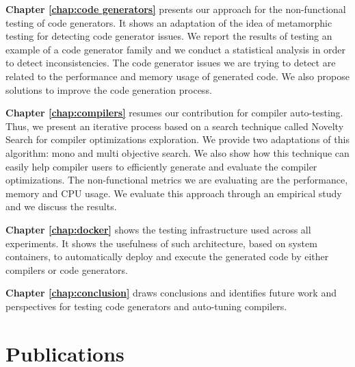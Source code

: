 \textbf{Chapter \ref{chap:code generators}} presents our approach for the non-functional testing of code generators. It shows an adaptation of the idea of metamorphic testing for detecting code generator issues. We report the results of testing an example of a code generator family and we conduct a statistical analysis in order to detect inconsistencies. The code generator issues we are trying to detect are related to the performance and memory usage of generated code. We also  propose solutions to improve the code generation process.

\textbf{Chapter \ref{chap:compilers}} resumes our contribution for compiler auto-testing. Thus, we present an iterative process based on a search technique called Novelty Search for compiler optimizations exploration. We provide two adaptations of this algorithm: mono and multi objective search. We also show how this technique can easily help compiler users to efficiently generate and evaluate the compiler optimizations. The non-functional metrics we are evaluating are the performance, memory and CPU usage. We evaluate this approach through an empirical study and we discuss the results.

\textbf{Chapter \ref{chap:docker}} shows the testing infrastructure used across all experiments. It shows the usefulness of such architecture, based on system containers, to automatically deploy and execute the generated code by either compilers or code generators. 

\textbf{Chapter \ref{chap:conclusion}} draws conclusions and identifies future work and perspectives for testing code generators and auto-tuning compilers.

\section{Publications}

